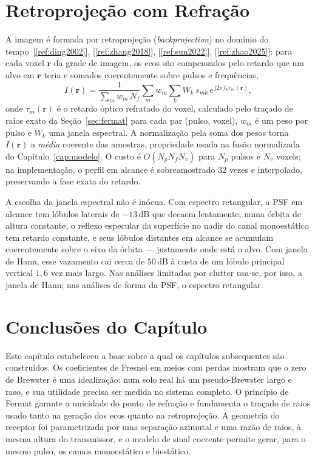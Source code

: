 \documentclass[12pt,a4paper,oneside]{book}
\theoremstyle{remark}
\newcommand{\vect}[1]{\boldsymbol{#1}}
\newcommand{\jj}{\mathrm{j}}
\newcommand{\dB}{\,\mathrm{dB}}
\newcommand{\citar}[1]{[\ref{ref:#1}]}
\theoremstyle{plain}
\theoremstyle{definition}
\begin{document}
\section{Retroprojeção com Refração}
\label{ssec:bp_algo}

A imagem é formada por retroprojeção (\textit{backprojection}) no domínio do
tempo~\citar{ding2002}, \citar{zhang2018}, \citar{sun2022}, \citar{zhao2025}: para cada voxel $\vect r$ da grade de
imagem, os ecos são compensados pelo retardo que um alvo em $\vect r$ teria e
somados coerentemente sobre pulsos e frequências,
\begin{equation}
  I(\vect r) = \frac{1}{\sum_m w_m\,N_f}\sum_m w_m\sum_k W_k\,s_{mk}\,
  e^{\,\jj 2\pi f_k \tau_m(\vect r)},
  \label{eq:bp}
\end{equation}
onde $\tau_m(\vect r)$ é o retardo óptico refratado do voxel, calculado pelo
traçado de raios exato da Seção~\ref{sec:fermat} para cada par
(pulso, voxel), $w_m$ é um peso por pulso e $W_k$ uma janela espectral. A
normalização pela soma dos pesos torna $I(\vect r)$ a \emph{média} coerente
das amostras, propriedade usada na fusão normalizada do
Capítulo~\ref{cap:modelo}. O custo é $O(N_p N_f N_v)$ para $N_p$ pulsos e
$N_v$ voxels; na implementação, o perfil em alcance é sobreamostrado $32$
vezes e interpolado, preservando a fase exata do retardo.

A escolha da janela espectral não é inócua. Com espectro retangular, a PSF em
alcance tem lóbulos laterais de $-13\dB$ que decaem lentamente; numa órbita de
altura constante, o reflexo especular da superfície no nadir do canal
monoestático tem retardo constante, e seus lóbulos distantes em alcance se
acumulam coerentemente sobre o eixo da órbita --- justamente onde está o
alvo. Com janela de Hann, esse vazamento cai cerca de $50\dB$ à custa de um
lóbulo principal vertical $1,6$ vez mais largo. Nas análises limitadas por
clutter usa-se, por isso, a janela de Hann; nas análises de forma da PSF,
o espectro retangular.

\section{Conclusões do Capítulo}
\label{sec:fund_concl}

Este capítulo estabeleceu a base sobre a qual os capítulos subsequentes são
construídos. Os coeficientes de Fresnel em meios com perdas mostram que o zero
de Brewster é uma idealização: num solo real há um pseudo-Brewster largo e
raso, e sua utilidade precisa ser medida no sistema completo. O princípio de
Fermat garante a unicidade do ponto de refração e fundamenta o traçado de raios
usado tanto na geração dos ecos quanto na retroprojeção. A geometria do
receptor foi parametrizada por uma separação azimutal e uma razão de raios, à
mesma altura do transmissor, e o modelo de sinal coerente permite gerar, para o
mesmo pulso, os canais monoestático e biestático.
\end{document}
